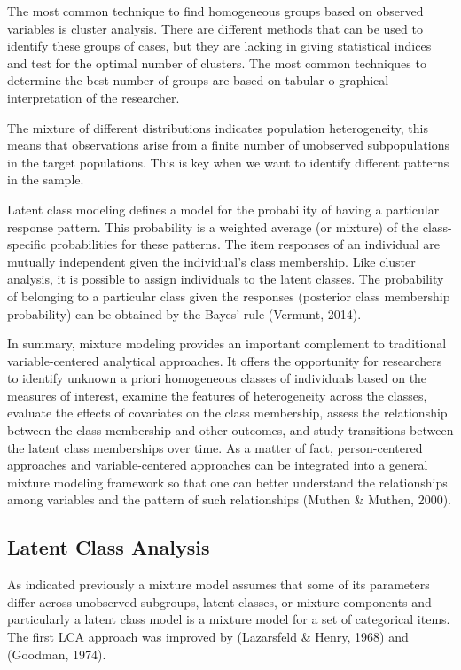 \documentclass[12pt,a4paper,oneside]{reedthesis}
\begin{document}
The most common technique to find homogeneous groups based on observed variables is cluster analysis. There are different methods that can be used to identify these groups of cases, but they are lacking in giving statistical indices and test for the optimal number of clusters. The most common techniques to determine the best number of groups are based on tabular o graphical interpretation of the researcher.

The mixture of different distributions indicates population heterogeneity, this means that observations arise from a finite number of unobserved subpopulations in the target populations. This is key when we want to identify different patterns in the sample.

Latent class modeling defines a model for the probability of having a particular response pattern. This probability is a weighted average (or mixture) of the class-specific probabilities for these patterns. The item responses of an individual are mutually independent given the individual's class membership. Like cluster analysis, it is possible to assign individuals to the latent classes. The probability of belonging to a particular class given the responses (posterior class membership probability) can be obtained by the Bayes' rule (Vermunt, 2014).

In summary, mixture modeling provides an important complement to traditional variable-centered analytical approaches. It offers the opportunity for researchers to identify unknown a priori homogeneous classes of individuals based on the measures of interest, examine the features of heterogeneity across the classes, evaluate the effects of covariates on the class membership, assess the relationship between the class membership and other outcomes, and study transitions between the latent class memberships over time. As a matter of fact, person-centered approaches and variable-centered approaches can be integrated into a general mixture modeling framework so that one can better understand the relationships among variables and the pattern of such relationships (Muthen \& Muthen, 2000).

\hypertarget{latent-class-analysis}{%
\subsection{Latent Class Analysis}\label{latent-class-analysis}}

As indicated previously a mixture model assumes that some of its parameters differ across unobserved subgroups, latent classes, or mixture components and particularly a latent class model is a mixture model for a set of categorical items. The first LCA approach was improved by (Lazarsfeld \& Henry, 1968) and (Goodman, 1974).
\end{document}
